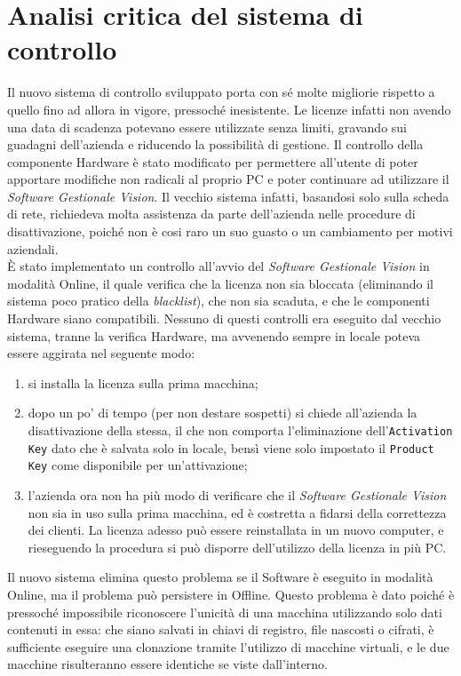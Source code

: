 \section{Analisi critica del sistema di controllo}

Il nuovo sistema di controllo sviluppato porta con sé molte migliorie rispetto a quello fino ad allora in vigore, pressoché inesistente. Le licenze infatti non avendo una data di scadenza potevano essere utilizzate senza limiti, gravando sui guadagni dell'azienda e riducendo la possibilità di gestione. Il controllo della componente Hardware è stato modificato per permettere all'utente di poter apportare modifiche non radicali al proprio PC e poter continuare ad utilizzare il \textit{Software Gestionale Vision}. Il vecchio sistema infatti, basandosi solo sulla scheda di rete, richiedeva molta assistenza da parte dell'azienda nelle procedure di disattivazione, poiché non è cosi raro un suo guasto o un cambiamento per motivi aziendali.
\\È stato implementato un controllo all'avvio del \textit{Software Gestionale Vision} in modalità Online, il quale verifica che la licenza non sia bloccata (eliminando il sistema poco pratico della \textit{blacklist}), che non sia scaduta, e che le componenti Hardware siano compatibili. Nessuno di questi controlli era eseguito dal vecchio sistema, tranne la verifica Hardware, ma avvenendo sempre in locale poteva essere aggirata nel seguente modo:
\begin{enumerate}
\item si installa la licenza sulla prima macchina;
\item dopo un po' di tempo (per non destare sospetti) si chiede all'azienda la disattivazione della stessa, il che non comporta l'eliminazione dell'\texttt{Activation Key} dato che è salvata solo in locale, bensì viene solo impostato il \texttt{Product Key} come disponibile per un'attivazione;
\item l'azienda ora non ha più modo di verificare che il \textit{Software Gestionale Vision} non sia in uso sulla prima macchina, ed è costretta a fidarsi della correttezza dei clienti. La licenza adesso può essere reinstallata in un nuovo computer, e rieseguendo la procedura si può disporre dell'utilizzo della licenza in più PC.
\end{enumerate}
Il nuovo sistema elimina questo problema se il Software è eseguito in modalità Online, ma il problema può persistere in Offline. Questo problema è dato poiché è pressoché impossibile riconoscere l'unicità di una macchina utilizzando solo dati contenuti in essa: che siano salvati in chiavi di registro, file nascosti o cifrati, è sufficiente eseguire una clonazione tramite l'utilizzo di macchine virtuali, e le due macchine risulteranno essere identiche se viste dall'interno.
